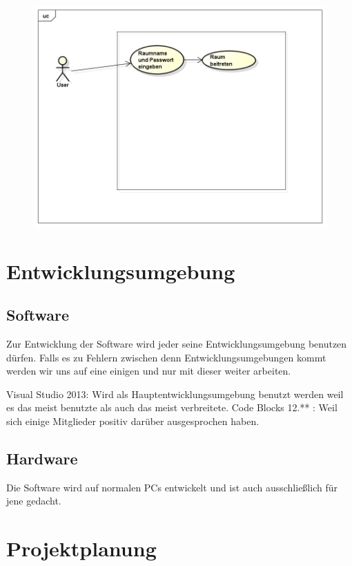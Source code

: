 \documentclass[a4paper,12pt]{scrreprt}
\begin{document}
	\begin{figure}[h]
		\centering
		\includegraphics[width=0.9\linewidth]{VPN_Raum_Beitreten}
		\caption{}
		\label{fig:VPN_Raum_Beitreten}
	\end{figure}

	
\chapter{Entwicklungsumgebung}
	
	\section{Software}
		Zur Entwicklung der Software wird jeder seine Entwicklungsumgebung benutzen dürfen. Falls es zu Fehlern zwischen denn Entwicklungsumgebungen kommt werden wir uns auf eine einigen und nur mit dieser weiter arbeiten. 
		
		Visual Studio 2013: Wird als Hauptentwicklungsumgebung benutzt werden weil es das meist benutzte als auch das meist verbreitete.  
		Code Blocks 12.** : Weil sich einige Mitglieder positiv darüber ausgesprochen haben.
		
		
		
		
	\section{Hardware}
		
		
		Die Software wird auf normalen PCs entwickelt und ist auch ausschließlich für jene gedacht.
		
		
		
\chapter{Projektplanung}



	
	
\end{document}
